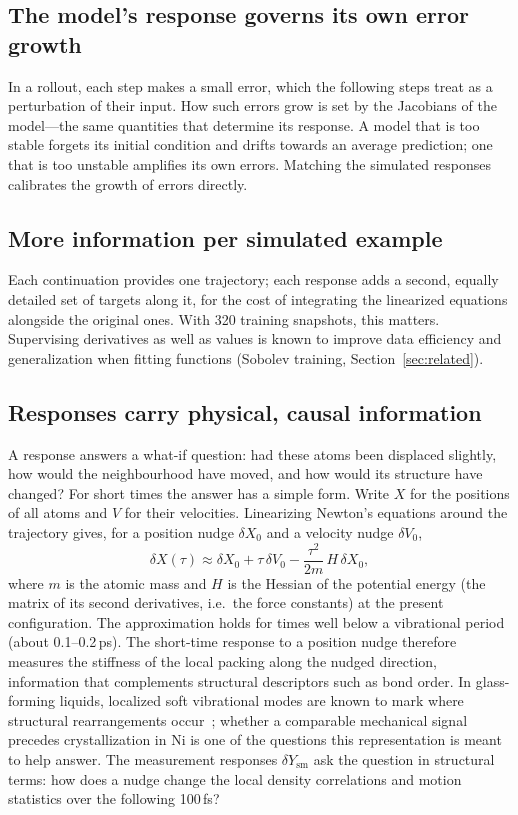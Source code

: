 \documentclass[11pt,a4paper]{article}
\numberwithin{equation}{section}
\newcommand{\sm}{\mathrm{sm}}
\begin{document}
\subsection{The model's response governs its own error growth}

In a rollout, each step makes a small error, which the following steps treat as a
perturbation of their input. How such errors grow is set by the Jacobians of the
model---the same quantities that determine its response. A model that is too stable
forgets its initial condition and drifts towards an average prediction; one that is
too unstable amplifies its own errors. Matching the simulated responses calibrates
the growth of errors directly.

\subsection{More information per simulated example}

Each continuation provides one trajectory; each response adds a second, equally
detailed set of targets along it, for the cost of integrating the linearized
equations alongside the original ones. With 320 training snapshots, this matters.
Supervising derivatives as well as values is known to improve data efficiency and
generalization when fitting functions (Sobolev training, Section~\ref{sec:related}).

\subsection{Responses carry physical, causal information}

A response answers a what-if question: had these atoms been displaced slightly,
how would the neighbourhood have moved, and how would its structure have changed?
For short times the answer has a simple form. Write $X$ for the positions of all
atoms and $V$ for their velocities. Linearizing Newton's equations around the
trajectory gives, for a position nudge $\delta X_0$ and a velocity nudge
$\delta V_0$,
\begin{equation}
\delta X(\tau)\approx\delta X_0+\tau\,\delta V_0-\frac{\tau^2}{2m}\,H\,\delta X_0,
\label{eq:hessian}
\end{equation}
where $m$ is the atomic mass and $H$ is the Hessian of the potential energy (the
matrix of its second derivatives, i.e.\ the force constants) at the present
configuration. The approximation holds for times well below a vibrational period
(about 0.1--0.2\,ps). The short-time response to a position nudge therefore measures
the stiffness of the local packing along the nudged direction, information that
complements structural descriptors such as bond order. In glass-forming liquids, localized soft
vibrational modes are known to mark where structural rearrangements
occur~\cite{softmodes}; whether a comparable mechanical signal precedes
crystallization in Ni is one of the questions this representation is meant to help
answer. The measurement responses $\delta Y_\sm$ ask the question in structural
terms: how does a nudge change the local density correlations and motion
statistics over the following 100\,fs?
\end{document}
